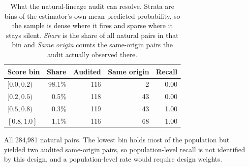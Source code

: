 \begin{table}[t]
\centering\footnotesize\setlength{\tabcolsep}{3pt}
\caption{What the natural-lineage audit can resolve. Strata are bins of the estimator's own mean predicted probability, so the sample is dense where it fires and sparse where it stays silent. \emph{Share} is the share of all natural pairs in that bin and \emph{Same origin} counts the same-origin pairs the audit actually observed there.}
\label{tab:stratum}
\begin{tabular}{lrrrr}
\toprule
Score bin & Share & Audited & Same origin & Recall \\
\midrule
$[0.0,0.2)$ & 98.1\% & 116 & 2 & 0.00 \\
$[0.2,0.5)$ & 0.5\% & 118 & 43 & 0.00 \\
$[0.5,0.8)$ & 0.3\% & 119 & 43 & 1.00 \\
$[0.8,1.0]$ & 1.1\% & 116 & 68 & 1.00 \\
\bottomrule
\end{tabular}\par\vspace{3pt}
{\footnotesize\raggedright
All 284{,}981 natural pairs. The lowest bin holds most of the population but yielded two audited same-origin pairs, so population-level recall is not identified by this design, and a population-level rate would require design weights.\par}
\end{table}
